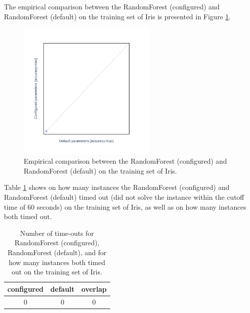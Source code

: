 \documentclass[british]{article}
\newif\ifruntime
\begin{document}
The empirical comparison between the RandomForest (configured) and RandomForest (default) on the training set of Iris is presented in Figure \ref{fig:configured_vs_default_train}.

\begin{figure}[htbp]
\noindent \begin{centering}
\includegraphics[width=0.6\textwidth]{data_RandomForest_configured_vs_default_on_Iris}
\par\end{centering}

\caption{Empirical comparison between the RandomForest (configured) and RandomForest (default) on the training set of Iris.}\label{fig:configured_vs_default_train}
\end{figure}


Table \ref{tbl:timeouts_train} shows on how many instances the RandomForest (configured) and RandomForest (default) timed out (did not solve the instance within the cutoff time of 60 seconds) on the training set of Iris, as well as on how many instances both timed out.

    \begin{table}[htbp]
        \centering
            \begin{tabular}{ccc}
                configured & default & overlap \\ \hline
                0 & 0 & 0
            \end{tabular}
            \caption{Number of time-outs for RandomForest (configured), RandomForest (default), and for how many instances both timed out on the training set of Iris.}
        \label{tbl:timeouts_train}
    \end{table}
\end{document}
